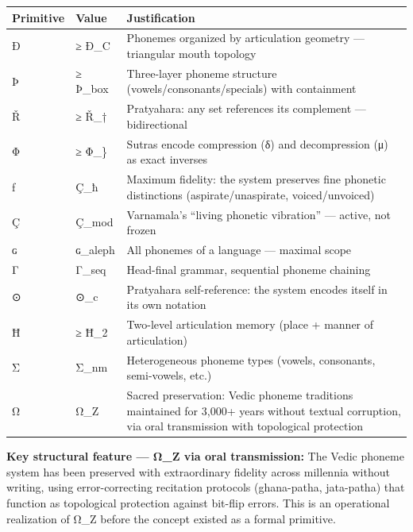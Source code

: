 \documentclass[
  11pt,
  a4paper,
]{article}
\newcounter{none} %
\begin{document}
{\def\LTcaptype{none} %
\begin{longtable}[]{@{}
  >{\raggedright\arraybackslash}p{}
  >{\raggedright\arraybackslash}p{}
  >{\raggedright\arraybackslash}p{}@{}}
\toprule\noalign{}
\begin{minipage}[b]{\linewidth}\raggedright
Primitive
\end{minipage} & \begin{minipage}[b]{\linewidth}\raggedright
Value
\end{minipage} & \begin{minipage}[b]{\linewidth}\raggedright
Justification
\end{minipage} \\
\midrule\noalign{}
\endhead
\bottomrule\noalign{}
\endlastfoot
Ð & ≥ Ð\_C & Phonemes organized by articulation geometry --- triangular
mouth topology \\
Þ & ≥ Þ\_box & Three-layer phoneme structure
(vowels/consonants/specials) with containment \\
Ř & ≥ Ř\_† & Pratyahara: any set references its complement ---
bidirectional \\
Φ & ≥ Φ\_\} & Sutras encode compression (δ) and decompression (μ) as
exact inverses \\
ƒ & Ç\_ħ & Maximum fidelity: the system preserves fine phonetic
distinctions (aspirate/unaspirate, voiced/unvoiced) \\
Ç & Ç\_mod & Varnamala's ``living phonetic vibration'' --- active, not
frozen \\
ɢ & ɢ\_aleph & All phonemes of a language --- maximal scope \\
Γ & Γ\_seq & Head-final grammar, sequential phoneme chaining \\
⊙ & ⊙\_c & Pratyahara self-reference: the system encodes itself in its
own notation \\
Ħ & ≥ Ħ\_2 & Two-level articulation memory (place + manner of
articulation) \\
Σ & Σ\_nm & Heterogeneous phoneme types (vowels, consonants,
semi-vowels, etc.) \\
Ω & Ω\_Z & Sacred preservation: Vedic phoneme traditions maintained for
3,000+ years without textual corruption, via oral transmission with
topological protection \\
\end{longtable}
}

\textbf{Key structural feature --- Ω\_Z via oral transmission:} The
Vedic phoneme system has been preserved with extraordinary fidelity
across millennia without writing, using error-correcting recitation
protocols (ghana-patha, jata-patha) that function as topological
protection against bit-flip errors. This is an operational realization
of Ω\_Z before the concept existed as a formal primitive.
\end{document}
